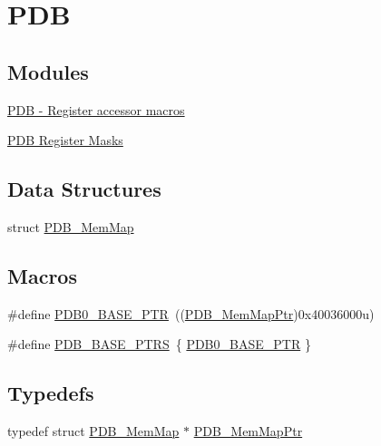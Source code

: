\hypertarget{group___p_d_b___peripheral}{}\section{P\+D\+B}
\label{group___p_d_b___peripheral}
\subsection*{Modules}
\begin{DoxyCompactItemize}
\item 
\hyperlink{group___p_d_b___register___accessor___macros}{P\+D\+B -\/ Register accessor macros}
\item 
\hyperlink{group___p_d_b___register___masks}{P\+D\+B Register Masks}
\end{DoxyCompactItemize}
\subsection*{Data Structures}
\begin{DoxyCompactItemize}
\item 
struct \hyperlink{struct_p_d_b___mem_map}{P\+D\+B\+\_\+\+Mem\+Map}
\end{DoxyCompactItemize}
\subsection*{Macros}
\begin{DoxyCompactItemize}
\item 
\#define \hyperlink{group___p_d_b___peripheral_ga8e197b7c43fd7a0bf1a38caa1918b7b5}{P\+D\+B0\+\_\+\+B\+A\+S\+E\+\_\+\+P\+T\+R}~((\hyperlink{group___p_d_b___peripheral_ga99a192ea14b33afb792a0de304e131be}{P\+D\+B\+\_\+\+Mem\+Map\+Ptr})0x40036000u)
\item 
\#define \hyperlink{group___p_d_b___peripheral_ga6dce940c99da63282b1d28f65ed75293}{P\+D\+B\+\_\+\+B\+A\+S\+E\+\_\+\+P\+T\+R\+S}~\{ \hyperlink{group___p_d_b___peripheral_ga8e197b7c43fd7a0bf1a38caa1918b7b5}{P\+D\+B0\+\_\+\+B\+A\+S\+E\+\_\+\+P\+T\+R} \}
\end{DoxyCompactItemize}
\subsection*{Typedefs}
\begin{DoxyCompactItemize}
\item 
typedef struct \hyperlink{struct_p_d_b___mem_map}{P\+D\+B\+\_\+\+Mem\+Map} $\ast$ \hyperlink{group___p_d_b___peripheral_ga99a192ea14b33afb792a0de304e131be}{P\+D\+B\+\_\+\+Mem\+Map\+Ptr}
\end{DoxyCompactItemize}


